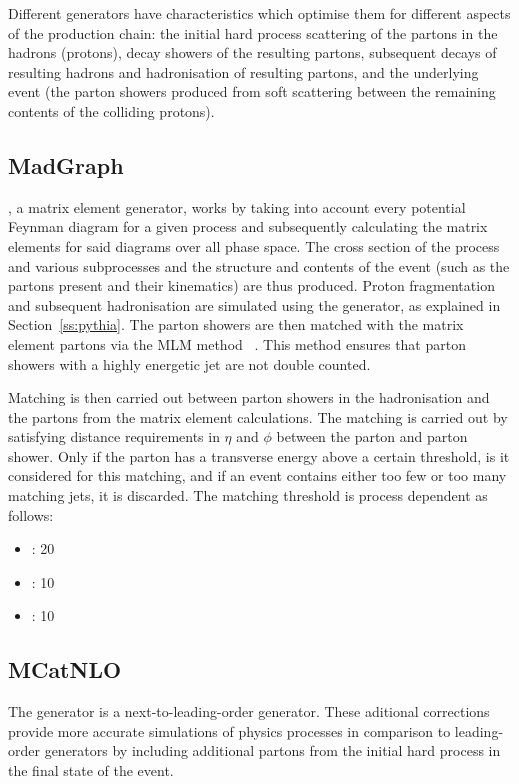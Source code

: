 Different generators have characteristics which optimise them for different aspects of the production chain:
the initial hard process scattering of the partons in the hadrons (protons), decay showers of the resulting
partons, subsequent decays of resulting hadrons and hadronisation of resulting partons, and the underlying
event (the parton showers produced from soft scattering between the remaining contents of the colliding
protons). 

\subsection{MadGraph}
\label{ss:madgraph}
\MADGRAPH \cite{madgraph5}, a matrix element generator, works by taking into account every potential Feynman
diagram for a given process and subsequently calculating the matrix elements for said diagrams over all phase
space. The cross section of the process and various subprocesses and the structure and contents of the event
(such as the partons present and their kinematics) are thus produced. %
Proton fragmentation and subsequent hadronisation are simulated using the \PYTHIA generator, as explained in
Section~\ref{ss:pythia}. The parton showers are then matched with the matrix element partons via the MLM
method ~\cite{mlm}. This method ensures that parton showers with a highly energetic jet are not double
counted.

Matching is then carried out between parton showers in the hadronisation and the partons from the
matrix element calculations. The matching is carried out by satisfying distance requirements in $\eta$ and
$\phi$ between the parton and parton shower. Only if the parton has a transverse energy above a certain
threshold, is it considered for this matching, and if an event contains either too few or too many matching jets, it is
discarded. The matching threshold is process dependent as follows:
\begin{itemize}
  \item \ttbar: 20\GeV
  \item \WpJets: 10\GeV
  \item \ZpJets: 10\GeV
\end{itemize}

\subsection{MCatNLO}
\label{ss:mcatnlo}
The \MCATNLO \cite{mcatnlo_Frixione1, mcatnlo_Frixione2} generator is a next-to-leading-order generator. These
aditional corrections provide more accurate simulations of physics processes in comparison to leading-order
generators by including additional partons from the initial hard process in the final state of the event.


